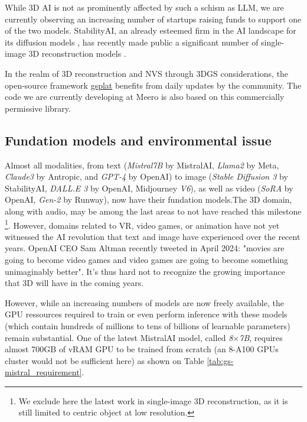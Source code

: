 While 3D \ac{AI} is not as prominently affected by such a schism as \ac{LLM}, we are currently observing an increasing number of startups raising funds to support one of the two models. StabilityAI, an already esteemed firm in the \ac{AI} landscape for its diffusion models \citep{esser2024scaling}, has recently made public a significant number of single-image 3D reconstruction models \citep{tochilkin2024triposr,voleti2024sv3d}. 

In the realm of 3D reconstruction and \ac{NVS} through 3D\ac{GS} considerations, the open-source framework \href{https://docs.gsplat.studio/main/}{gsplat} benefits from daily updates by the community. The code we are currently developing at Meero is also based on this commercially permissive library. 

\subsection{Fundation models and environmental issue}

Almost all modalities, from text (\textit{Mistral7B} by MistralAI, \textit{Llama2} by Meta, \textit{Claude3} by Antropic, and \textit{GPT-4} by OpenAI) to image (\textit{Stable Diffusion 3} by StabilityAI, \textit{DALL.E 3} by OpenAI, Midjourney \textit{V6}), as well as video (\textit{SoRA} by OpenAI, \textit{Gen-2} by Runway), now have their fundation models.The 3D domain, along with audio, may be among the last areas to not have reached this milestone \footnote{We exclude here the latest work in single-image 3D reconstruction, as it is still limited to centric object at low resolution.}. However, domains related to \ac{VR}, video games, or animation have not yet witnessed the \ac{AI} revolution that text and image have experienced over the recent years. OpenAI CEO Sam Altman recently tweeted in April 2024: "movies are going to become video games and video games are going to become something unimaginably better". It's thus hard not to recognize the growing importance that 3D will have in the coming years.

However, while an increasing numbers of models are now freely available, the \ac{GPU} ressources required to train or even perform inference with these models (which contain hundreds of millions to tens of billions of learnable parameters) remain substantial. One of the latest MistralAI model, called \textit{8}$\times$\textit{7B}, requires almost 700GB of vRAM \ac{GPU} to be trained from scratch (an 8-A100 \ac{GPU}s cluster would not be sufficient here) as shown on Table \ref{tab:gs-mistral_requirement}. 

